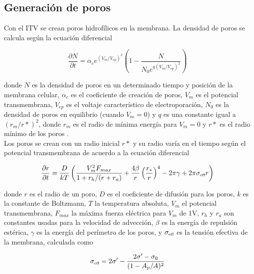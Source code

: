 \documentclass[a4paper,10pt]{article}
\begin{document}

\subsection{Generación de poros}
Con el ITV se crean poros hidrofílicos en la membrana. La densidad de poros se calcula según la ecuación diferencial  

\begin{equation} \label{eq:poros-crea}
	\frac{\partial N}{\partial t} = \alpha_c e^{(V_m/V_{ep})^2} \left( 1 - \frac{N}{N_0 e^{q \left(V_m/V_{ep} \right) ^2}} \right)
\end{equation}

donde $N$ es la densidad de poros en un determinado tiempo y posición de la membrana celular, $\alpha_c$ es el coeficiente de creación de poros, $V_m$ es el potencial transmembrana, $V_{ep}$ es el voltaje característico de electroporación, $N_0$ es la densidad de poros en equilibrio (cuando $V_m = 0$) y $q$ es una constante igual a $(r_m / r*)^2$, donde $r_m$ es el radio de mínima energía para $V_m = 0$ y $r*$ es el radio mínimo de los poros \cite{krass}.\\

Los poros se crean con un radio inicial $r*$ y su radio varía en el tiempo según el potencial transmembrana de acuerdo a la ecuación diferencial

\begin{equation} \label{eq:poros-radio}
	\frac{\partial r}{\partial t} = \frac{D}{kT} \left( \frac{V_m^2 F_{max}}{1+r_h / (r+r_a)} + \frac{4 \beta}{r} \left(\frac{r_*}{r}\right)^4 - 2 \pi \gamma + 2 \pi \sigma_{\textrm{\tiny eff}} r\right)
\end{equation}

donde $r$ es el radio de un poro, $D$ es el coeficiente de difusión para los poros, $k$ es la constante de Boltzmann, $T$ la temperatura absoluta, $V_m$ el potencial transmembrana, $F_{max}$ la máxima fuerza eléctrica para $V_m$ de 1V, $r_h$ y $r_a$ son constantes usadas para la velocidad de advección, $\beta$ es la energía de repulsión estérica, $\gamma$ es la energía del perímetro de los poros, y $\sigma_{\textrm{\tiny eff}}$ es la tensión efectiva de la membrana, calculada como

\begin{equation}
	\sigma_{\textrm{\tiny eff}} = 2 \sigma^\prime - \frac{2 \sigma^\prime - \sigma_0}{(1 - A_p / A)^2}
\end{equation}
\end{document}
